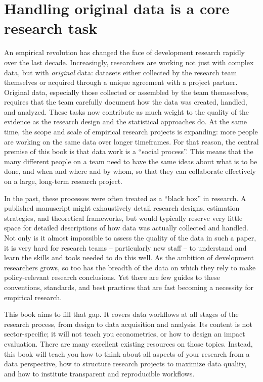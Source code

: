 
\section{Handling original data is a core research task}

An empirical revolution has changed the face of development research rapidly over the last decade.
Increasingly, researchers are working not just with complex data,
but with \textit{original} data:
datasets either collected by the research team themselves
or acquired through a unique agreement with a project partner.
Original data, especially those collected or assembled by the team themsselves,
requires that the team carefully document how the data was created, handled, and analyzed.
These tasks now contribute as much weight to the quality of the evidence
as the research design and the statistical approaches do.
At the same time, the scope and scale of empirical research projects is expanding:
more people are working on the same data over longer timeframes.
For that reason, the central premise of this book is that data work is a ``social process''.
This means that the many different people on a team need to have the same ideas
about what is to be done, and when and where and by whom,
so that they can collaborate effectively on a large, long-term research project.

In the past, these processes were often treated as a ``black box'' in research.
A published manuscript might exhaustively detail
research designs, estimation strategies, and theoretical frameworks,
but would typically reserve very little space for detailed descriptions
of how data was actually collected and handled.
Not only is it almost impossible to assess the quality of the data in such a paper,
it is very hard for research teams -- particularly new staff --
to understand and learn the skills and tools needed to do this well.
As the ambition of development researchers grows, so too has the breadth of the data
on which they rely to make policy-relevant research conclusions.
Yet there are few guides to these conventions, standards, and best practices
that are fast becoming a necessity for empirical research.

This book aims to fill that gap.
It covers data workflows at all stages of the research process,
from design to data acquisition and analysis.
Its content is not sector-specific;
it will not teach you econometrics,
or how to design an impact evaluation.
There are many excellent existing resources on those topics.
Instead, this book will teach you how to think about all aspects of your research from a data perspective,
how to structure research projects to maximize data quality,
and how to institute transparent and reproducible workflows.

